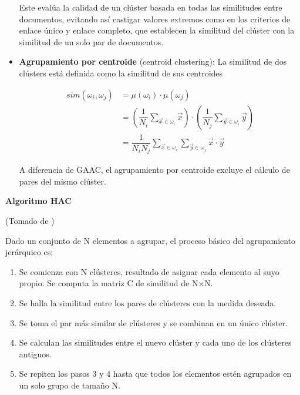 \documentclass{llncs}
\begin{document}
\begin{itemize}
	Este evalúa la calidad de un clúster basada en todas las similitudes entre documentos, evitando así castigar valores extremos como en los criterios de enlace único y enlace completo, que establecen la similitud del cl\'uster con la similitud de un solo par de documentos.
	
	\vspace{1em}
	\item \textbf{Agrupamiento por centroide} (centroid clustering): La similitud de dos cl\'usters est\'a definida como la similitud de sus centroides

		\begin{align}
			sim(\omega_{i}, \omega_{j}) &= \mu(\omega_{i})\cdot\mu(\omega_{j}) \nonumber\\
			&= \left(\dfrac{1}{N_{i}}\sum_{\overrightarrow{x} \in \omega_{i}}\overrightarrow{x}\right) \cdot \left(\dfrac{1}{N_{j}}\sum_{\overrightarrow{y} \in \omega_{i}}\overrightarrow{y}\right) \nonumber\\
			& = \dfrac{1}{N_{i}N_{j}} \sum_{\overrightarrow{x} \in \omega_{i}}\sum_{\overrightarrow{y} \in \omega_{j}}\overrightarrow{x}\cdot\overrightarrow{y} \nonumber
		\end{align}
	
	A diferencia de GAAC, el agrupamiento por centroide excluye el c\'alculo de pares del mismo cl\'uster.
\end{itemize}

\vspace{1em}
\textbf{Algoritmo HAC}
\begin{flushright}
	\scriptsize*(Tomado de \cite{B1})
	\normalsize
\end{flushright}

Dado un conjunto de N elementos a agrupar, el proceso básico del agrupamiento jerárquico es:
\begin{enumerate}
	\item Se comienza con N cl\'usteres, resultado de asignar cada elemento al suyo propio. Se computa la matriz C de similitud de N×N.
	
	\item Se halla la similitud entre los pares de cl\'usteres con la medida deseada.
	
	\item Se toma el par más similar de clústeres y se combinan en un único clúster.
	
	\item Se calculan las similitudes entre el nuevo clúster y cada uno de los cl\'usteres antiguos.
	
	\item Se repiten los pasos 3 y 4 hasta que todos los elementos estén agrupados en un solo grupo de tamaño N.
\end{enumerate}
\end{document}
